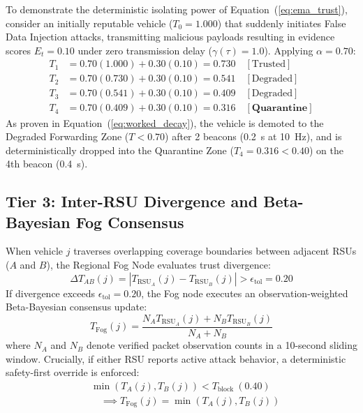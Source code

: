 \documentclass[conference]{IEEEtran}
\begin{document}
To demonstrate the deterministic isolating power of Equation~(\ref{eq:ema_trust}), consider an initially reputable vehicle ($T_0 = 1.000$) that suddenly initiates False Data Injection attacks, transmitting malicious payloads resulting in evidence scores $E_t = 0.10$ under zero transmission delay ($\gamma(\tau) = 1.0$). Applying $\alpha = 0.70$:
\begin{align}
T_1 &= 0.70(1.000) + 0.30(0.10) = 0.730 \quad [\text{Trusted}] \nonumber \\
T_2 &= 0.70(0.730) + 0.30(0.10) = 0.541 \quad [\text{Degraded}] \nonumber \\
T_3 &= 0.70(0.541) + 0.30(0.10) = 0.409 \quad [\text{Degraded}] \nonumber \\
T_4 &= 0.70(0.409) + 0.30(0.10) = \mathbf{0.316} \quad [\mathbf{Quarantine}]
\label{eq:worked_decay}
\end{align}
As proven in Equation~(\ref{eq:worked_decay}), the vehicle is demoted to the Degraded Forwarding Zone ($T < 0.70$) after 2 beacons (0.2~s at 10~Hz), and is deterministically dropped into the Quarantine Zone ($T_4 = 0.316 < 0.40$) on the 4th beacon (0.4~s).

\subsection{Tier 3: Inter-RSU Divergence and Beta-Bayesian Fog Consensus}

When vehicle $j$ traverses overlapping coverage boundaries between adjacent RSUs ($A$ and $B$), the Regional Fog Node evaluates trust divergence:
\begin{equation}
\Delta T_{AB}(j) = |T_{\text{RSU}_A}(j) - T_{\text{RSU}_B}(j)| > \epsilon_{\text{tol}} = 0.20
\label{eq:divergence}
\end{equation}
If divergence exceeds $\epsilon_{\text{tol}} = 0.20$, the Fog node executes an observation-weighted Beta-Bayesian consensus update:
\begin{equation}
T_{\text{Fog}}(j) = \frac{N_A T_{\text{RSU}_A}(j) + N_B T_{\text{RSU}_B}(j)}{N_A + N_B}
\label{eq:fog_consensus}
\end{equation}
where $N_A$ and $N_B$ denote verified packet observation counts in a 10-second sliding window. Crucially, if either RSU reports active attack behavior, a deterministic safety-first override is enforced:
\begin{equation}
\begin{aligned}
&\min(T_A(j), T_B(j)) < T_{\text{block}} \ (0.40) \\
&\quad \implies T_{\text{Fog}}(j) = \min(T_A(j), T_B(j))
\end{aligned}
\label{eq:safety_override}
\end{equation}
\end{document}
